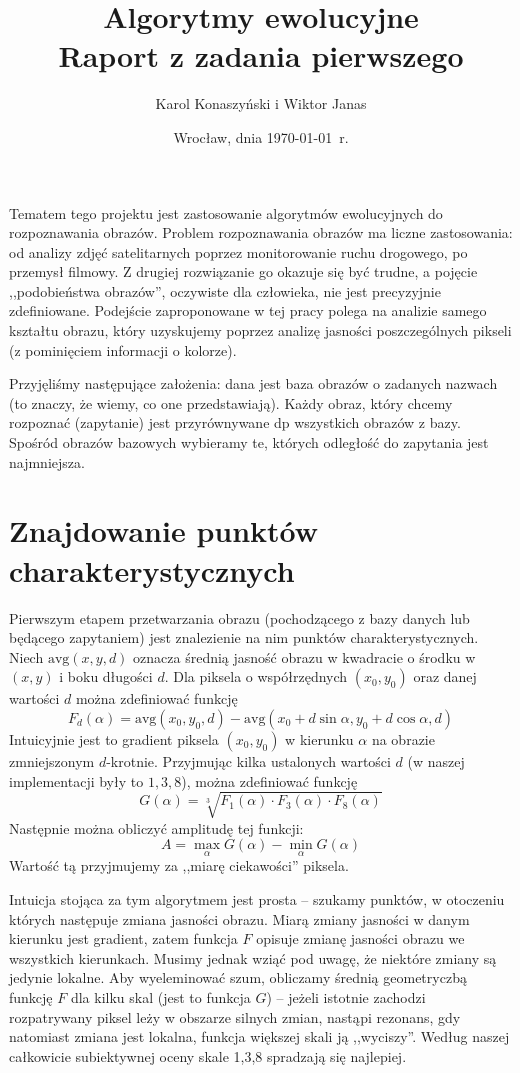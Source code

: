 \documentclass[a4paper,12pt,leqno]{article}
\title{\textbf{Algorytmy ewolucyjne}\\
       {\Large Raport z zadania pierwszego}\\[-1ex]}
\author{Karol Konaszyński i Wiktor Janas}
\date{Wrocław, dnia \today\ r.}
\newcommand{\avg}{\mathrm{avg}}
\begin{document}
\maketitle

Tematem tego projektu jest zastosowanie algorytmów ewolucyjnych do rozpoznawania obrazów. 
Problem rozpoznawania obrazów ma liczne zastosowania: od analizy zdjęć satelitarnych poprzez monitorowanie ruchu drogowego, po przemysł filmowy.
Z drugiej rozwiązanie go okazuje się być trudne, a pojęcie ,,podobieństwa obrazów'', oczywiste dla człowieka, nie jest precyzyjnie zdefiniowane.
Podejście zaproponowane w tej pracy polega na analizie samego kształtu obrazu, który uzyskujemy poprzez analizę jasności poszczególnych
pikseli (z pominięciem informacji o kolorze).

Przyjęliśmy następujące założenia: dana jest baza obrazów o zadanych nazwach (to znaczy, że wiemy, co one przedstawiają).
Każdy obraz, który chcemy rozpoznać (zapytanie) jest przyrównywane dp wszystkich obrazów z bazy.
Spośród obrazów bazowych wybieramy te, których odległość do zapytania jest najmniejsza.

\section{Znajdowanie punktów charakterystycznych}
Pierwszym etapem przetwarzania obrazu (pochodzącego z bazy danych lub będącego zapytaniem) jest znalezienie na nim punktów charakterystycznych.
Niech $\avg(x,y,d)$ oznacza średnią jasność obrazu w kwadracie o środku w $(x,y)$ i boku długości $d$. Dla piksela o współrzędnych $(x_0,y_0)$ oraz danej
wartości $d$ można zdefiniować funkcję
\[ F_d(\alpha) = \avg(x_0,y_0,d) - \avg( x_0+d\sin\alpha, y_0+d\cos\alpha, d) \]
Intuicyjnie jest to gradient piksela $(x_0,y_0)$ w kierunku $\alpha$ na obrazie zmniejszonym $d$-krotnie. Przyjmując kilka ustalonych wartości $d$
(w naszej implementacji były to $1,3,8$), można zdefiniować funkcję
\[ G(\alpha) = \sqrt[3]{F_1(\alpha) \cdot F_3(\alpha) \cdot F_8(\alpha)} \]
Następnie można obliczyć amplitudę tej funkcji:
\[ A = \max_\alpha G(\alpha) - \min_\alpha G(\alpha) \]
Wartość tą przyjmujemy za ,,miarę ciekawości'' piksela. 

Intuicja stojąca za tym algorytmem jest prosta -- szukamy punktów, w otoczeniu których następuje zmiana jasności obrazu. Miarą zmiany jasności w danym
kierunku jest gradient, zatem funkcja $F$ opisuje zmianę jasności obrazu we wszystkich kierunkach. Musimy jednak wziąć pod uwagę, że niektóre zmiany są
jedynie lokalne. Aby wyeleminować szum, obliczamy średnią geometryczbą funkcję $F$ dla kilku skal (jest to funkcja $G$) -- jeżeli istotnie zachodzi
rozpatrywany piksel leży w obszarze silnych zmian, nastąpi rezonans, gdy natomiast zmiana jest lokalna, funkcja większej skali ją ,,wyciszy''.
Według naszej całkowicie subiektywnej oceny skale 1,3,8 spradzają się najlepiej.
\end{document}

